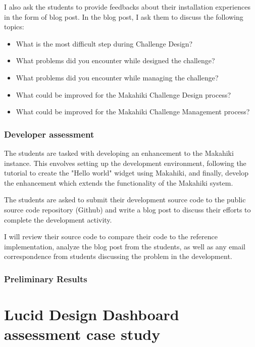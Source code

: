 I also ask the students to provide feedbacks about their installation experiences in the form of blog post. In the blog post, I ask them to discuss the following topics:
\begin{itemize}
\item What is the most difficult step during Challenge Design?
\item What problems did you encounter while designed the challenge?
\item What problems did you encounter while managing the challenge?
\item What could be improved for the Makahiki Challenge Design process?
\item What could be improved for the Makahiki Challenge Management process?
\end{itemize}

\subsubsection{Developer assessment}

The students are tasked with developing an enhancement to the Makahiki instance. This envolves setting up the development environment, following the tutorial to create the "Hello world" widget using Makahiki, and finally, develop the enhancement which extends the functionality of the Makahiki system.

The students are asked to submit their development source code to the public source code repository (Github) and write a blog post to discuss their efforts to complete the development activity.

I will review their source code to compare their code to the reference implementation, analyze the blog post from the students, as well as any email correspondence from students discussing the problem in the development.

\subsubsection{Preliminary Results}

\section{Lucid Design Dashboard assessment case study}
